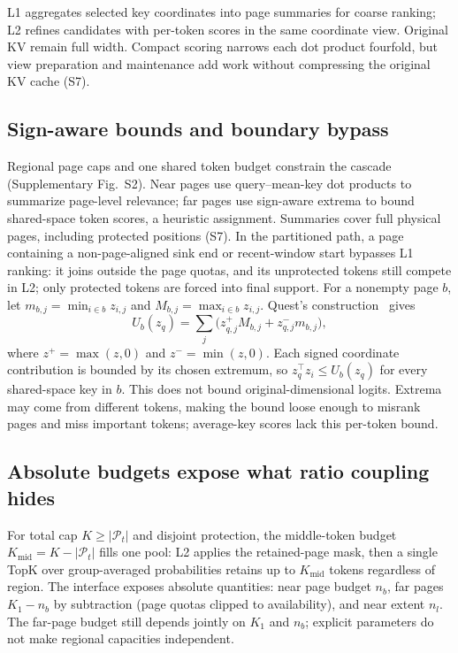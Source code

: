 \documentclass[conference,9pt,letterpaper]{IEEEtran}
\begin{document}
L1 aggregates selected key coordinates into page summaries for coarse ranking; L2 refines candidates with per-token scores in the same coordinate view. Original KV remain full width. Compact scoring narrows each dot product fourfold, but view preparation and maintenance add work without compressing the original KV cache (S7).

\subsection{Sign-aware bounds and boundary bypass}
Regional page caps and one shared token budget constrain the cascade (Supplementary Fig.~S2). Near pages use query--mean-key dot products to summarize page-level relevance; far pages use sign-aware extrema to bound shared-space token scores, a heuristic assignment. Summaries cover full physical pages, including protected positions (S7). In the partitioned path, a page containing a non-page-aligned sink end or recent-window start bypasses L1 ranking: it joins outside the page quotas, and its unprotected tokens still compete in L2; only protected tokens are forced into final support. For a nonempty page $b$, let $m_{b,j}=\min_{i\in b}z_{i,j}$ and $M_{b,j}=\max_{i\in b}z_{i,j}$. Quest's construction~\cite{quest} gives
\begin{equation}
U_b(z_q)=\sum_j\bigl(z_{q,j}^{+}M_{b,j}+z_{q,j}^{-}m_{b,j}\bigr),
\label{eq:bound}
\end{equation}
where $z^+=\max(z,0)$ and $z^-=\min(z,0)$. Each signed coordinate contribution is bounded by its chosen extremum, so $z_q^\top z_i\leq U_b(z_q)$ for every shared-space key in $b$. This does not bound original-dimensional logits. Extrema may come from different tokens, making the bound loose enough to misrank pages and miss important tokens; average-key scores lack this per-token bound.

\subsection{Absolute budgets expose what ratio coupling hides}
For total cap $K\geq|\mathcal P_t|$ and disjoint protection, the middle-token budget $K_{\mathrm{mid}}=K-|\mathcal P_t|$ fills one pool: L2 applies the retained-page mask, then a single TopK over group-averaged probabilities retains up to $K_{\mathrm{mid}}$ tokens regardless of region. The interface exposes absolute quantities: near page budget $n_b$, far pages $K_1-n_b$ by subtraction (page quotas clipped to availability), and near extent $n_l$. The far-page budget still depends jointly on $K_1$ and $n_b$; explicit parameters do not make regional capacities independent.
\end{document}
